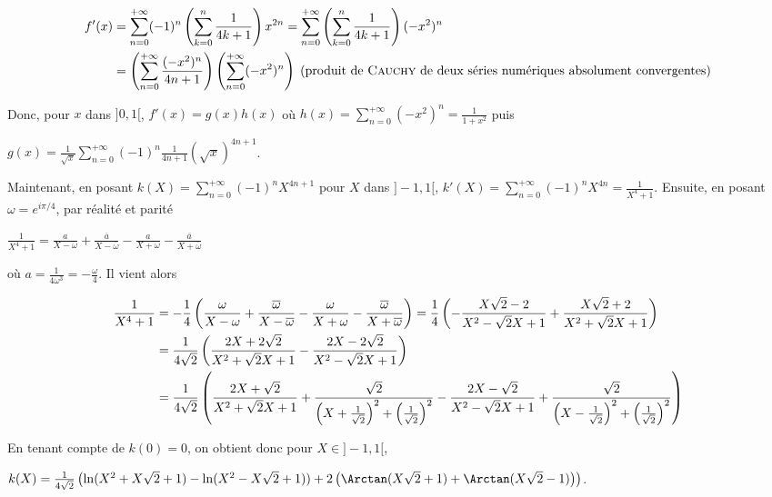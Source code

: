 {{\begin{align*}\ensuremath
f'(x)&=\sum_{n=0}^{+\infty}(-1)^n\left(\sum_{k=0}^{n}\frac{1}{4k+1}\right)x^{2n}=\sum_{n=0}^{+\infty}\left(\sum_{k=0}^{n}\frac{1}{4k+1}\right)(-x^2)^n\\
 &=\left(\sum_{n=0}^{+\infty}\frac{(-x^2)^n}{4n+1}\right)\left(\sum_{n=0}^{+\infty}(-x^2)^n\right)\;(\text{produit de \textsc{Cauchy} de deux séries numériques absolument convergentes})
\end{align*}

Donc, pour $x$ dans $]0,1[$, $f'(x)  = g(x)h(x)$ où $h(x) =\sum_{n=0}^{+\infty}(-x^2)^n =\frac{1}{1+x^2}$ puis 

\begin{center}
$g(x) =\frac{1}{\sqrt{x}}\sum_{n=0}^{+\infty}(-1)^n\frac{1}{4n+1}(\sqrt{x})^{4n+1}$.
\end{center}

Maintenant, en posant $k(X)=\sum_{n=0}^{+\infty}(-1)^n X^{4n+1}$ pour $X$ dans $]-1,1[$, $k'(X)=\sum_{n=0}^{+\infty}(-1)^nX^{4n}=\frac{1}{X^4+1}$. Ensuite, en posant $\omega=e^{i\pi/4}$, par réalité et parité

\begin{center}
$\frac{1}{X^4+1}=\frac{a}{X-\omega}+\frac{\overline{a}}{X-\overline{\omega}}-\frac{a}{X+\omega}-\frac{\overline{a}}{X+\overline{\omega}}$
\end{center}

où $a=\frac{1}{4\omega^3}=-\frac{\omega}{4}$. Il vient alors

\begin{align*}\ensuremath
\frac{1}{X^4+1}&=-\frac{1}{4}\left(\frac{\omega}{X-\omega}+\frac{\overline{\omega}}{X-\overline{\omega}}-\frac{\omega}{X+\omega}-\frac{\overline{\omega}}{X+\overline{\omega}}\right)=\frac{1}{4}\left(-\frac{X\sqrt{2}-2}{X^2-\sqrt{2}X+1}+\frac{X\sqrt{2}+2}{X^2+\sqrt{2}X+1}\right)\\
 &=\frac{1}{4\sqrt{2}}\left(\frac{2X+2\sqrt{2}}{X^2+\sqrt{2}X+1}-\frac{2X-2\sqrt{2}}{X^2-\sqrt{2}X+1}\right)\\
 &=\frac{1}{4\sqrt{2}}\left(\frac{2X+\sqrt{2}}{X^2+\sqrt{2}X+1}+\frac{\sqrt{2}}{\left(X+\frac{1}{\sqrt{2}}\right)^2+\left(\frac{1}{\sqrt{2}}\right)^2}-\frac{2X-\sqrt{2}}{X^2-\sqrt{2}X+1}+\frac{\sqrt{2}}{\left(X-\frac{1}{\sqrt{2}}\right)^2+\left(\frac{1}{\sqrt{2}}\right)^2}\right)
\end{align*}
 

En tenant compte de $k(0) = 0$, on obtient donc pour $X\in]-1,1[$,

\begin{center}
$k(X) =\frac{1}{4\sqrt{2}}\left(\ln(X^2+X\sqrt{2}+1)-\ln(X^2-X\sqrt{2}+1))+2\left(\Arctan(X\sqrt{2}+1)+\Arctan(X\sqrt{2}-1)\right)\right)$.
\end{center}

}}
